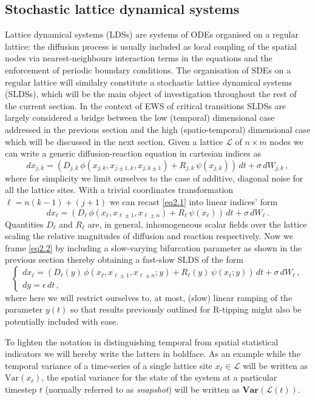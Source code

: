 \documentclass[../main.tex]{subfiles}
\begin{document}
\subsection{Stochastic lattice dynamical systems}\label{subsec3.1}
Lattice dynamical systems (LDSs) are systems of ODEs organised on a regular lattice: the diffusion process is usually included as local coupling of the spatial nodes via nearest-neighbours interaction terms in the equations and the enforcement of periodic boundary conditions. 
The organisation of SDEs on a regular lattice will similalry constitute a stochastic lattice dynamical systems (SLDSs), which will be the main object of investigation throughout the rest of the current section.
In the context of EWS of critical transitions SLDSs are largely considered a bridge between the low (temporal) dimensional case addressed in the previous section and the high (spatio-temporal) dimensional case which will be discussed in the next section.
Given a lattice $\mathcal{L}$ of $n\times m$ nodes we can write a generic diffusion-reaction equation in cartesian indices as
\begin{equation}\label{eq2.1}
     dx_{j,k} = (D_{j,k}\,\phi(x_{j,k}, x_{j\pm1,k}, x_{j,k\pm1}) + R_{j,k}\,\psi(x_{j,k}))\,dt + \sigma\,dW_{j,k}\,,
\end{equation}
where for simplicity we limit ourselves to the case of additive, diagonal noise for all the lattice sites.
With a trivial coordinates transformation $\ell = n(k-1)+(j+1)$ we can recast \eqref{eq2.1} into linear indices' form
\begin{equation}\label{eq2.2}
     dx_{\ell} = (D_{\ell}\,\phi(x_{\ell}, x_{\ell\pm1}, x_{\ell\pm n}) + R_{\ell}\,\psi(x_{\ell}))\,dt + \sigma\,dW_{\ell}\,.
\end{equation}
Quantities $D_{\ell}$ and $R_{\ell}$ are, in general, inhomogeneous scalar fields over the lattice scaling the relative magnitudes of diffusion and reaction respectively. 
Now we frame \eqref{eq2.2} by including a slow-varying bifurcation parameter as shown in the previous section thereby obtaining a fast-slow SLDS of the form
\begin{equation}\label{eq2.3}
   \begin{cases}
   dx_{\ell} = (D_{\ell}(y)\,\phi(x_{\ell}, x_{\ell\pm1}, x_{\ell\pm n}; y) + R_{\ell}(y)\,\psi(x_{\ell}; y))\,dt + \sigma\,dW_{\ell} \,, \\
      dy = \epsilon\,dt \,, 
   \end{cases}
\end{equation}
where here we will restrict ourselves to, at most, (slow) linear ramping of the parameter $y(t)$ so that results previously outlined for R-tipping might also be potentially included with ease.
\begin{interpretation*}{}
        To lighten the notation in distinguishing temporal from spatial statistical indicators we will hereby write the latters in boldface. 
        As an example while the temporal variance of a time-series of a single lattice site $x_{\ell}\in \mathcal{L}$ will be written as $\text{Var}(x_{\ell})$, the spatial variance for the state of the system at a particular timestep $t$ (normally referred to as \textit{snapshot}) will be written as $\mathbf{Var}(\mathcal{L}(t))$.
\end{interpretation*}
\end{document}
